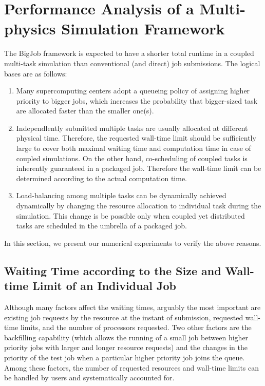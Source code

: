 \documentclass[preprint,12pt]{elsarticle}
\begin{document}
\section{Performance Analysis of a Multi-physics Simulation Framework}
\label{sec:performance}

The BigJob framework is expected to have a shorter total runtime in a coupled multi-task simulation than conventional (and direct) job submissions. The logical bases are as follows:
\begin{enumerate}
\item Many supercomputing centers adopt a queueing policy of assigning higher priority to bigger jobs, which increases the probability that bigger-sized task are allocated faster than the smaller one(s).
\item Independlently submitted multiple tasks are usually allocated at different physical time. Therefore, the requested wall-time limit should be sufficiently large to cover both maximal waiting time and computation time in case of coupled simulations. On the other hand, co-scheduling of coupled tasks is inherently guaranteed in a packaged job. Therefore the wall-time limit can be determined according to the actual computation time.
\item Load-balancing among multiple tasks can be dynamically achieved dynamically by changing the resource allocation to individual task during the simulation. This change is be possible only when coupled yet distributed tasks are scheduled in the umbrella of a packaged job.
\end{enumerate}

In this section, we present our numerical experiments to verify the above reasons.


\subsection{Waiting Time according to the Size and Wall-time Limit of an Individual Job}
\label{sec:performance_preliminary}

Although many factors affect the waiting times, arguably the most important are existing job requests by the resource at the instant of submission, requested wall-time limits, and the number of processors requested. Two other factors are the backfilling capability (which allows the running of a small job between higher priority jobs with larger and longer resource requests) and the changes in the priority of the test job when a particular higher priority job joins the queue. Among these factors, the number of requested resources and wall-time limits can be handled by users and systematically accounted for.
\end{document}
